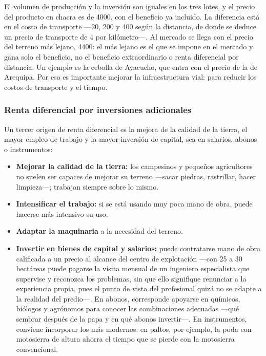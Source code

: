 \documentclass[
  man,
  floatsintext,
  longtable,
  a4paper,
  nolmodern,
  notxfonts,
  notimes,
  12pt,
  colorlinks=true,linkcolor=blue,citecolor=blue,urlcolor=blue]{apa7}
\providecommand{\tightlist}{%
  \setlength{\itemsep}{0pt}\setlength{\parskip}{0pt}}
\begin{document}
El volumen de producción y la inversión son iguales en los tres lotes, y
el precio del producto en chacra es de 4000, con el beneficio ya
incluido. La diferencia está en el costo de transporte ---20, 200 y 400
según la distancia, de donde se deduce un precio de transporte de 4 por
kilómetro---. Al mercado se llega con el precio del terreno más lejano,
4400: el más lejano es el que se impone en el mercado y gana solo el
beneficio, no el beneficio extraordinario o renta diferencial por
distancia. Un ejemplo es la cebolla de Ayacucho, que entra con el precio
de la de Arequipa. Por eso es importante mejorar la infraestructura
vial: para reducir los costos de transporte y el tiempo.

\subsubsection{Renta diferencial por inversiones
adicionales}\label{renta-diferencial-por-inversiones-adicionales}

Un tercer origen de renta diferencial es la mejora de la calidad de la
tierra, el mayor empleo de trabajo y la mayor inversión de capital, sea
en salarios, abonos o instrumentos:

\begin{itemize}
\tightlist
\item
  \textbf{Mejorar la calidad de la tierra:} los campesinos y pequeños
  agricultores no suelen ser capaces de mejorar su terreno ---sacar
  piedras, rastrillar, hacer limpieza---; trabajan siempre sobre lo
  mismo.
\item
  \textbf{Intensificar el trabajo:} si se está usando muy poca mano de
  obra, puede hacerse más intensivo su uso.
\item
  \textbf{Adaptar la maquinaria} a la necesidad del terreno.
\item
  \textbf{Invertir en bienes de capital y salarios:} puede contratarse
  mano de obra calificada a un precio al alcance del centro de
  explotación ---con 25 a 30 hectáreas puede pagarse la visita mensual
  de un ingeniero especialista que supervise y reconozca los problemas,
  sin que ello signifique renunciar a la experiencia propia, pues el
  punto de vista del profesional quizá no se adapte a la realidad del
  predio---. En abonos, corresponde apoyarse en químicos, biólogos y
  agrónomos para conocer las combinaciones adecuadas ---qué sembrar
  después de la papa y en qué abonos invertir---. En instrumentos,
  conviene incorporar los más modernos: en paltos, por ejemplo, la poda
  con motosierra de altura ahorra el tiempo que se pierde con la
  motosierra convencional.
\end{itemize}
\end{document}
